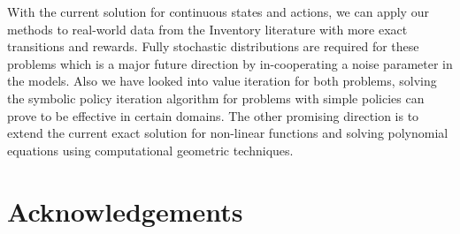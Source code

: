 \documentclass[twoside,11pt]{article}
\begin{document}
With the current solution for continuous states and actions, we can apply our methods to real-world data from the Inventory literature with more exact transitions and rewards. Fully stochastic distributions are required for these problems which is a major future direction by in-cooperating a noise parameter in the models. 
Also we have looked into value iteration for both problems, solving the symbolic policy iteration algorithm for problems with simple policies can prove to be effective in certain domains. 
The other promising direction is to extend the current exact solution for non-linear functions and solving polynomial equations using computational geometric techniques. 


\section*{Acknowledgements}


\vskip 0.2in


\end{document}
